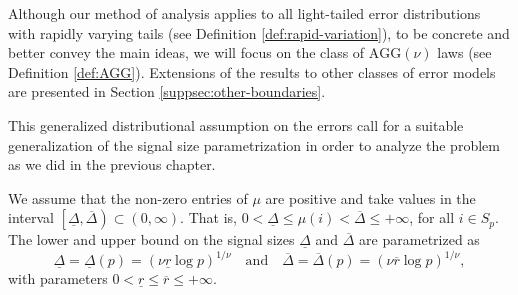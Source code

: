 Although our method of analysis applies to all light-tailed error distributions with rapidly varying tails (see Definition \ref{def:rapid-variation}), to be concrete and better convey the main ideas, we will focus on the class of $\mathrm{AGG}(\nu)$ laws (see Definition \ref{def:AGG}).
Extensions of the results to other classes of error models are presented in Section \ref{suppsec:other-boundaries}.

This generalized distributional assumption on the errors call for a suitable generalization of the signal size parametrization in order to analyze the problem as we did in the previous chapter.

We assume that the non-zero entries of $\mu$ are positive and take values in the interval $\left[\underline{\Delta},\overline{\Delta}\right)\subset (0,\infty)$.
That is, $0<\underline{\Delta}\le\mu(i)<\overline{\Delta}\le+\infty$, for all $i\in S_p$.
The lower and upper bound on the signal sizes $\underline{\Delta}$ and $\overline{\Delta}$ are parametrized as
\begin{equation} \label{eq:signal-size-parametrized}
    \underline{\Delta} = \underline{\Delta}(p) = (\nu \underline{r} \log{p})^{1/\nu} \quad \text{and} \quad
    \overline{\Delta} = \overline{\Delta}(p)  = (\nu \overline{r} \log{p})^{1/\nu},
\end{equation}
with parameters $0 < \underline{r} \le \overline{r} \le +\infty$.

